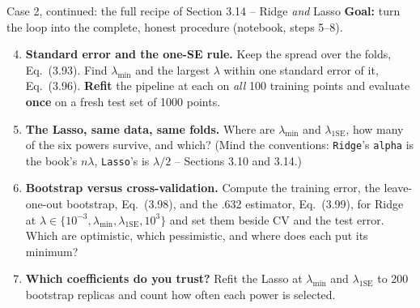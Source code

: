 \documentclass[10pt,aspectratio=169]{beamer}
\begin{document}
\begin{frame}[fragile]{Case 2, continued: the full recipe of Section 3.14 -- Ridge \emph{and} Lasso}
\textbf{Goal:} turn the loop into the complete, honest procedure (notebook, steps 5--8).
\begin{enumerate}
  \setcounter{enumi}{3}
  \item \textbf{Standard error and the one-SE rule.}  Keep the spread over
        the folds, Eq.~(3.93).  Find $\lambda_{\min}$ and the largest
        $\lambda$ within one standard error of it, Eq.~(3.96).  \textbf{Refit}
        the pipeline at each on \emph{all} 100 training points and evaluate
        \textbf{once} on a fresh test set of 1000 points.
  \item \textbf{The Lasso, same data, same folds.}  Where are
        $\lambda_{\min}$ and $\lambda_{1\mathrm{SE}}$, how many of the six
        powers survive, and which?  (Mind the conventions: \texttt{Ridge}'s
        \texttt{alpha} is the book's $n\lambda$, \texttt{Lasso}'s is
        $\lambda/2$ -- Sections 3.10 and 3.14.)
  \item \textbf{Bootstrap versus cross-validation.}  Compute the training
        error, the leave-one-out bootstrap, Eq.~(3.98), and the .632
        estimator, Eq.~(3.99), for Ridge at $\lambda\in\{10^{-3},
        \lambda_{\min},\lambda_{1\mathrm{SE}},10^{3}\}$ and set them beside
        CV and the test error.  Which are optimistic, which pessimistic, and
        where does each put its minimum?
  \item \textbf{Which coefficients do you trust?}  Refit the Lasso at
        $\lambda_{\min}$ and $\lambda_{1\mathrm{SE}}$ to 200 bootstrap
        replicas and count how often each power is selected.
\end{enumerate}
\end{frame}
\end{document}
